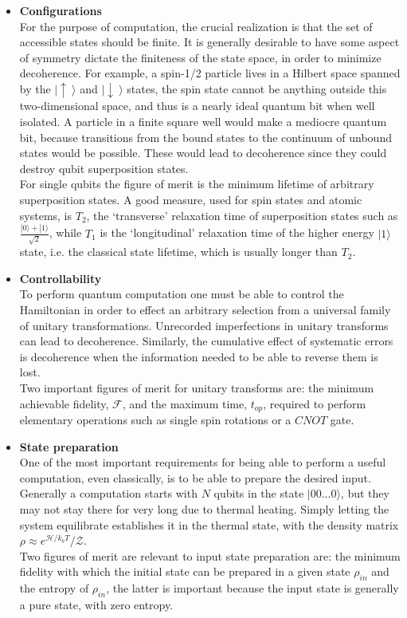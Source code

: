 \begin{itemize}
    \item \textbf{Configurations} \\
    For the purpose of computation, the crucial realization is that the set of accessible states should be finite. It is generally desirable to have some aspect of symmetry dictate the finiteness of the state space, in order to minimize decoherence. For example, a spin-1/2 particle lives in a Hilbert space spanned by the $|\uparrow \ \rangle$ and $|\downarrow \ \rangle$ states, the spin state cannot be anything outside this two-dimensional space, and thus is a nearly ideal quantum bit when well isolated. A particle in a finite square well would make a mediocre quantum bit, because transitions from the bound states to the continuum of unbound states would be possible. These would lead to decoherence since they could destroy qubit superposition states. \\
    For single qubits the figure of merit is the minimum lifetime of arbitrary superposition states. A good measure, used for spin states and atomic systems, is $T_2$, the ‘transverse’ relaxation time of superposition states such as $\frac{|0\rangle + |1\rangle}{\sqrt{2}}$, while $T_1$ is the ‘longitudinal’ relaxation time of the higher energy $|1\rangle$ state, i.e. the classical state lifetime, which is usually longer than $T_2$.
    
    \item \textbf{Controllability} \\
    To perform quantum computation one must be able to control the Hamiltonian in order to effect an arbitrary selection from a universal family of unitary transformations. Unrecorded imperfections in unitary transforms can lead to decoherence. Similarly, the cumulative effect of systematic errors is decoherence when the information needed to be able to reverse them is lost. \\
    Two important figures of merit for unitary transforms are: the minimum achievable fidelity, $\mathcal{F}$, and the maximum time, $t_{op}$, required to perform elementary operations such as single spin rotations or a $CNOT$ gate.
    
    \item \textbf{State preparation} \\
    One of the most important requirements for being able to perform a useful computation, even classically, is to be able to prepare the desired input. Generally a computation starts with $N$ qubits in the state $|00...0\rangle$, but they may not stay there for very long due to thermal heating. Simply letting the system equilibrate establishes it in the thermal state, with the density matrix $\rho \approx e^{\mathcal{H}/k_bT}/\mathcal{Z}$. \\
    Two figures of merit are relevant to input state preparation are: the minimum fidelity with which the initial state can be prepared in a given state $\rho_{in}$ and the entropy of $\rho_{in}$, the latter is important because the input state is generally a pure state, with zero entropy.
    

\end{itemize}
